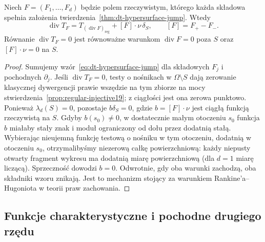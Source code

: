 \begin{wniosek}
Niech $F=(F_1,\ldots,F_d)$ będzie polem rzeczywistym,
którego każda składowa spełnia założenia
twierdzenia~\ref{thm:dt-hypersurface-jump}. Wtedy
\[
 \operatorname{div}T_F
 =T_{(\operatorname{div}F)_{\mathrm{reg}}}
 +[F]\cdot\nu\,\delta_S,\qquad [F]=F_+-F_-.
\]
Równanie $\operatorname{div}T_F=0$ jest równoważne
warunkom $\operatorname{div}F=0$ poza $S$ oraz
$[F]\cdot\nu=0$ na $S$.
\end{wniosek}
\begin{proof}
Sumujemy wzór~\eqref{eq:dt-hypersurface-jump} dla składowych
$F_j$ i pochodnych $\partial_j$.
Jeśli $\operatorname{div}T_F=0$, testy o nośnikach
w $\Omega\setminus S$ dają zerowanie klasycznej
dywergencji prawie wszędzie na tym zbiorze na mocy
stwierdzenia~\ref{prop:regular-injective19}; z ciągłości
jest ona zerowa punktowo. Ponieważ $\lambda_d(S)=0$,
pozostaje $b\delta_S=0$, gdzie $b=[F]\cdot\nu$ jest
ciągłą funkcją rzeczywistą na $S$.
Gdyby $b(s_0)\ne0$, w dostatecznie małym otoczeniu
$s_0$ funkcja $b$ miałaby stały znak i moduł
ograniczony od dołu przez dodatnią stałą.
Wybierając nieujemną funkcję testową o nośniku
w tym otoczeniu, dodatnią w otoczeniu $s_0$,
otrzymalibyśmy niezerową całkę powierzchniową:
każdy niepusty otwarty fragment wykresu ma dodatnią
miarę powierzchniową (dla $d=1$ miarę liczącą).
Sprzeczność dowodzi $b=0$. Odwrotnie, gdy oba
warunki zachodzą, oba składniki wzoru znikają.
Jest to mechanizm stojący za warunkiem
Rankine'a--Hugoniota w teorii praw zachowania.
\end{proof}

\subsection{Funkcje charakterystyczne i pochodne drugiego rzędu}

